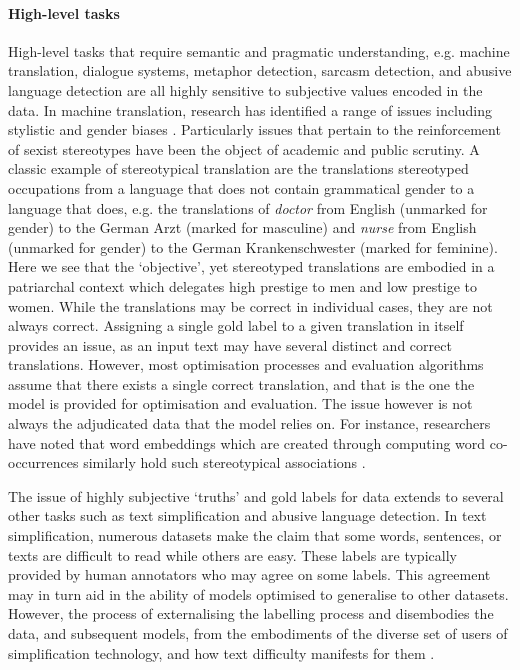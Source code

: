 {\paragraph{High-level tasks}
High-level tasks that require semantic and pragmatic understanding, e.g. machine translation, dialogue systems, metaphor detection, sarcasm detection, and abusive language detection are all highly sensitive to subjective values encoded in the data.
In machine translation, research has identified a range of issues including stylistic \citep{Hovy:2020} and gender biases \citep{Vanmassenhove:2018}.
Particularly issues that pertain to the reinforcement of sexist stereotypes have been the object of academic \citep{Zhao:2017} and public \citep{Locklear:2018} scrutiny. 
A classic example of stereotypical translation are the translations stereotyped occupations from a language that does not contain grammatical gender to a language that does, e.g. the translations of \textit{doctor} from English (unmarked for gender) to the German Arzt (marked for masculine) and \textit{nurse} from English (unmarked for gender) to the German Krankenschwester (marked for feminine).
Here we see that the `objective', yet stereotyped translations are embodied in a patriarchal context which delegates high prestige to men and low prestige to women.
While the translations may be correct in individual cases, they are not always correct.
Assigning a single gold label to a given translation in itself provides an issue, as an input text may have several distinct and correct translations.
However, most optimisation processes and evaluation algorithms assume that there exists a single correct translation, and that is the one the model is provided for optimisation and evaluation.
The issue however is not always the adjudicated data that the model relies on.
For instance, researchers have noted that word embeddings which are created through computing word co-occurrences similarly hold such stereotypical associations \citep{Bolukbasi:2016}.

The issue of highly subjective `truths' and gold labels for data extends to several other tasks such as text simplification and abusive language detection.
In text simplification, numerous datasets make the claim that some words, sentences, or texts are difficult to read while others are easy.
These labels are typically provided by human annotators who may agree on some labels. 
This agreement may in turn aid in the ability of models optimised to generalise to other datasets.
However, the process of externalising the labelling process and disembodies the data, and subsequent models, from the embodiments of the diverse set of users of simplification technology, and how text difficulty manifests for them \citep{Bingel:2018}.

}
